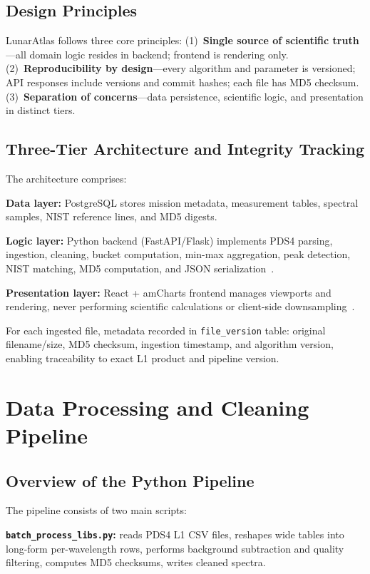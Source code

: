 \documentclass[11pt,a4paper]{article}
\begin{document}
\subsection{Design Principles}

LunarAtlas follows three core principles: (1)~\textbf{Single source of scientific truth}—all domain logic resides in backend; frontend is rendering only. (2)~\textbf{Reproducibility by design}—every algorithm and parameter is versioned; API responses include versions and commit hashes; each file has MD5 checksum. (3)~\textbf{Separation of concerns}—data persistence, scientific logic, and presentation in distinct tiers.

\subsection{Three-Tier Architecture and Integrity Tracking}

The architecture comprises:

\textbf{Data layer:} PostgreSQL stores mission metadata, measurement tables, spectral samples, NIST reference lines, and MD5 digests.

\textbf{Logic layer:} Python backend (FastAPI/Flask) implements PDS4 parsing, ingestion, cleaning, bucket computation, min-max aggregation, peak detection, NIST matching, MD5 computation, and JSON serialization~\cite{FastAPIIntro}.

\textbf{Presentation layer:} React + amCharts frontend manages viewports and rendering, never performing scientific calculations or client-side downsampling~\cite{amCharts}.

For each ingested file, metadata recorded in \texttt{file\_version} table: original filename/size, MD5 checksum, ingestion timestamp, and algorithm version, enabling traceability to exact L1 product and pipeline version.

\section{Data Processing and Cleaning Pipeline}
\label{sec:processing}

\subsection{Overview of the Python Pipeline}

The pipeline consists of two main scripts:

\textbf{\texttt{batch\_process\_libs.py}:} reads PDS4 L1 CSV files, reshapes wide tables into long-form per-wavelength rows, performs background subtraction and quality filtering, computes MD5 checksums, writes cleaned spectra.
\end{document}
